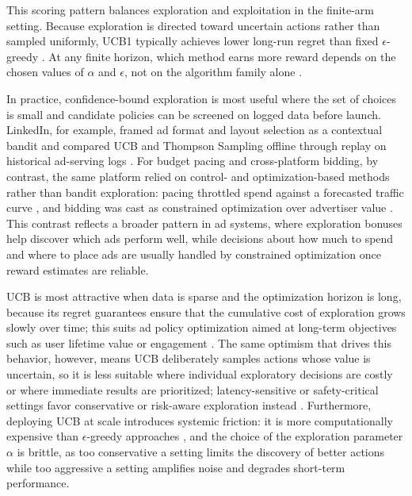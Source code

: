 \documentclass[manuscript,review,screen]{acmart}
\begin{document}
This scoring pattern balances exploration and exploitation in the finite-arm setting. Because exploration is directed toward uncertain actions rather than sampled uniformly, UCB1 typically achieves lower long-run regret than fixed $\epsilon$-greedy \cite{auer2002finite}. At any finite horizon, which method earns more reward depends on the chosen values of $\alpha$ and $\epsilon$, not on the algorithm family alone \cite{bubeck2012regret}.

In practice, confidence-bound exploration is most useful where the set of choices is small and candidate policies can be screened on logged data before launch. LinkedIn, for example, framed ad format and layout selection as a contextual bandit and compared UCB and Thompson Sampling offline through replay on historical ad-serving logs \cite{tang2013ad}. For budget pacing and cross-platform bidding, by contrast, the same platform relied on control- and optimization-based methods rather than bandit exploration: pacing throttled spend against a forecasted traffic curve \cite{agarwal2014budget}, and bidding was cast as constrained optimization over advertiser value \cite{gao2022bidding}. This contrast reflects a broader pattern in ad systems, where exploration bonuses help discover which ads perform well, while decisions about how much to spend and where to place ads are usually handled by constrained optimization once reward estimates are reliable.

UCB is most attractive when data is sparse and the optimization horizon is long, because its regret guarantees ensure that the cumulative cost of exploration grows slowly over time; this suits ad policy optimization aimed at long-term objectives such as user lifetime value or engagement \cite{bubeck2012regret, Theocharous-2015}. The same optimism that drives this behavior, however, means UCB deliberately samples actions whose value is uncertain, so it is less suitable where individual exploratory decisions are costly or where immediate results are prioritized; latency-sensitive or safety-critical settings favor conservative or risk-aware exploration instead \cite{mcmahan2013ad, dulac2021challenges}. Furthermore, deploying UCB at scale introduces systemic friction: it is more computationally expensive than $\epsilon$-greedy approaches \cite{bietti2021contextual}, and the choice of the exploration parameter $\alpha$ is brittle, as too conservative a setting limits the discovery of better actions while too aggressive a setting amplifies noise and degrades short-term performance.
    
\end{document}
